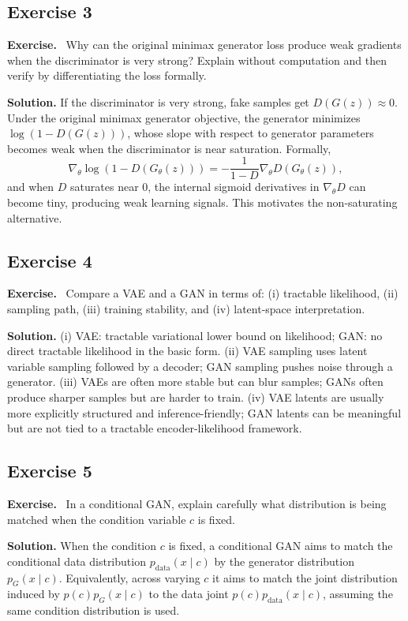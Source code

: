 \documentclass[11pt]{article}
\newenvironment{exercisebox}{\begin{framed}\noindent\textbf{Exercise.}\ }{\end{framed}}
\begin{document}
\subsection*{Exercise 3}
\begin{exercisebox}
Why can the original minimax generator loss produce weak gradients when the discriminator is very strong? Explain without computation and then verify by differentiating the loss formally.
\end{exercisebox}
\textbf{Solution.} If the discriminator is very strong, fake samples get $D(G(z))\approx 0$. Under the original minimax generator objective, the generator minimizes $\log(1-D(G(z)))$, whose slope with respect to generator parameters becomes weak when the discriminator is near saturation. Formally,
\[
\nabla_\theta \log(1-D(G_\theta(z))) = -\frac{1}{1-D}\nabla_\theta D(G_\theta(z)),
\]
and when $D$ saturates near $0$, the internal sigmoid derivatives in $\nabla_\theta D$ can become tiny, producing weak learning signals. This motivates the non-saturating alternative.

\subsection*{Exercise 4}
\begin{exercisebox}
Compare a VAE and a GAN in terms of: (i) tractable likelihood, (ii) sampling path, (iii) training stability, and (iv) latent-space interpretation.
\end{exercisebox}
\textbf{Solution.} (i) VAE: tractable variational lower bound on likelihood; GAN: no direct tractable likelihood in the basic form. (ii) VAE sampling uses latent variable sampling followed by a decoder; GAN sampling pushes noise through a generator. (iii) VAEs are often more stable but can blur samples; GANs often produce sharper samples but are harder to train. (iv) VAE latents are usually more explicitly structured and inference-friendly; GAN latents can be meaningful but are not tied to a tractable encoder-likelihood framework.

\subsection*{Exercise 5}
\begin{exercisebox}
In a conditional GAN, explain carefully what distribution is being matched when the condition variable $c$ is fixed.
\end{exercisebox}
\textbf{Solution.} When the condition $c$ is fixed, a conditional GAN aims to match the conditional data distribution $p_{\mathrm{data}}(x\mid c)$ by the generator distribution $p_G(x\mid c)$. Equivalently, across varying $c$ it aims to match the joint distribution induced by $p(c)p_G(x\mid c)$ to the data joint $p(c)p_{\mathrm{data}}(x\mid c)$, assuming the same condition distribution is used.
\end{document}
